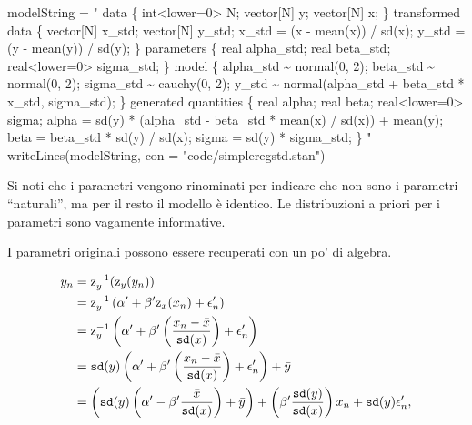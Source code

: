 \documentclass[
  10pt,
  italian,
  a4paper,
  extrafontsizes,onecolumn,openright
  ]{memoir}
\newenvironment{Shaded}{\begin{snugshade}}{\end{snugshade}}
\newcommand{\AttributeTok}[1]{\textcolor[rgb]{0.77,0.63,0.00}{#1}}
\newcommand{\FunctionTok}[1]{\textcolor[rgb]{0.00,0.00,0.00}{#1}}
\newcommand{\NormalTok}[1]{#1}
\newcommand{\OtherTok}[1]{\textcolor[rgb]{0.56,0.35,0.01}{#1}}
\newcommand{\StringTok}[1]{\textcolor[rgb]{0.31,0.60,0.02}{#1}}
\begin{document}
\begin{Shaded}
\begin{Highlighting}[]
\NormalTok{modelString }\OtherTok{=} \StringTok{"}
\StringTok{data \{}
\StringTok{  int\textless{}lower=0\textgreater{} N;}
\StringTok{  vector[N] y;}
\StringTok{  vector[N] x;}
\StringTok{\}}
\StringTok{transformed data \{}
\StringTok{  vector[N] x\_std;}
\StringTok{  vector[N] y\_std;}
\StringTok{  x\_std = (x {-} mean(x)) / sd(x);}
\StringTok{  y\_std = (y {-} mean(y)) / sd(y);}
\StringTok{\}}
\StringTok{parameters \{}
\StringTok{  real alpha\_std;}
\StringTok{  real beta\_std;}
\StringTok{  real\textless{}lower=0\textgreater{} sigma\_std;}
\StringTok{\}}
\StringTok{model \{}
\StringTok{  alpha\_std \textasciitilde{} normal(0, 2);}
\StringTok{  beta\_std \textasciitilde{} normal(0, 2);}
\StringTok{  sigma\_std \textasciitilde{} cauchy(0, 2);}
\StringTok{  y\_std \textasciitilde{} normal(alpha\_std + beta\_std * x\_std, sigma\_std);}
\StringTok{\}}
\StringTok{generated quantities \{}
\StringTok{  real alpha;}
\StringTok{  real beta;}
\StringTok{  real\textless{}lower=0\textgreater{} sigma;}
\StringTok{  alpha = sd(y) * (alpha\_std {-} beta\_std * mean(x) / sd(x))}
\StringTok{           + mean(y);}
\StringTok{  beta = beta\_std * sd(y) / sd(x);}
\StringTok{  sigma = sd(y) * sigma\_std;}
\StringTok{\}}
\StringTok{"}
\FunctionTok{writeLines}\NormalTok{(modelString, }\AttributeTok{con =} \StringTok{"code/simpleregstd.stan"}\NormalTok{)}
\end{Highlighting}
\end{Shaded}

Si noti che i parametri vengono rinominati per indicare che non sono i parametri ``naturali'', ma per il resto il modello è identico. Le distribuzioni a priori per i parametri sono vagamente informative.

I parametri originali possono essere recuperati con un po' di algebra.

\begin{align}
y_n &= \textrm{z}_y^{-1}(\textrm{z}_y(y_n)) \notag\\
    &= \textrm{z}_y^{-1}
\left( \alpha' + \beta' \textrm{z}_x(x_n) + \epsilon_n' \right) \notag\\
    &= \textrm{z}_y^{-1}
\left( \alpha' + \beta' \left( \frac{x_n - \bar{x}}{\texttt{sd}(x)} \right) + \epsilon_n' \right) \notag\\
    &= \texttt{sd}(y)
\left( \alpha' + \beta' \left( \frac{x_n - \bar{x}}{\texttt{sd}(x)} \right) + \epsilon_n' \right) + \bar{y} \notag\\
    &=
\left( \texttt{sd}(y) \left( \alpha' - \beta' \frac{\bar{x}}{\texttt{sd}(x)} \right) + \bar{y} \right)
+ \left( \beta' \frac{\texttt{sd}(y)}{\texttt{sd}(x)} \right) x_n
+ \texttt{sd}(y) \epsilon'_n,
\end{align}
\end{document}
